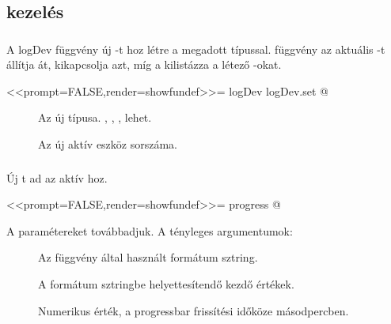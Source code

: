 \subsection{ kezelés}
\subsubsection{}
A logDev függvény új -t hoz létre a megadott
típussal.  függvény 
az aktuális -t állítja át, 
kikapcsolja azt, míg a 
 kilistázza a létező -okat.
\begin{Rnw}
<<prompt=FALSE,render=showfundef>>=
logDev
logDev.set
@
\end{Rnw}
\begin{description}
\item[]Az új  típusa. , , ,  lehet.
\item[]Az új aktív eszköz sorszáma. 
\end{description}


\subsubsection{}

Új t ad az aktív hoz.
\begin{Rnw}
<<prompt=FALSE,render=showfundef>>=
progress
@
\end{Rnw}
A paramétereket továbbadjuk. A tényleges argumentumok:
\begin{description}
\item[] Az  függvény által használt
  formátum sztring. 
\item[] A formátum sztringbe helyettesítendő kezdő értékek.
\item[] Numerikus érték, a progressbar frissítési
  időköze másodpercben. 
\end{description}

